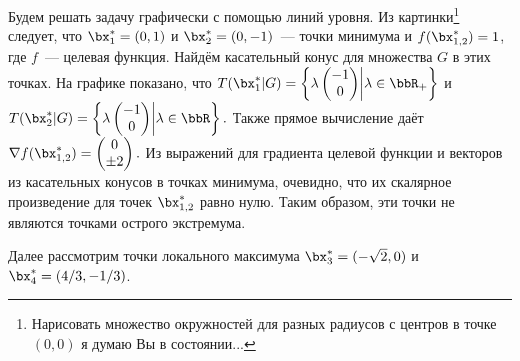 \documentclass[12pt]{article}
\begin{document}
Будем решать задачу графически с помощью линий уровня.
Из картинки\footnote{Нарисовать множество окружностей для разных радиусов с центров в точке $(0, 0)$ я думаю Вы в состоянии...} следует, что $\bx^*_1 = (0,1)$ и $\bx^*_2 = (0, -1)$~--- точки минимума и $f(\bx^*_{1,2}) = 1$, где $f$~--- целевая функция.
Найдём касательный конус для множества $G$ в этих точках.
На графике показано, что $T(\bx^*_1|G) = \left\{\lambda 
\begin{pmatrix}
-1\\
0
\end{pmatrix} 
\middle | \lambda \in \bbR_+
\right\}$
и $T(\bx^*_2|G) = \left\{\lambda 
\begin{pmatrix}
-1\\
0
\end{pmatrix} 
\middle | \lambda \in \bbR 
\right\}.$
Также прямое вычисление даёт $\nabla f(\bx^*_{1,2}) = 
\begin{pmatrix}
0\\
\pm 2
\end{pmatrix}.$
Из выражений для градиента целевой функции и векторов из касательных конусов в точках минимума, очевидно, что их скалярное произведение для точек $\bx^*_{1,2}$ равно нулю.
Таким образом, эти точки не являются точками острого экстремума.

Далее рассмотрим точки локального максимума $\bx^*_3 = (-\sqrt{2}, 0)$ и $\bx^*_4 = (4/3, -1/3)$.
\end{document}
